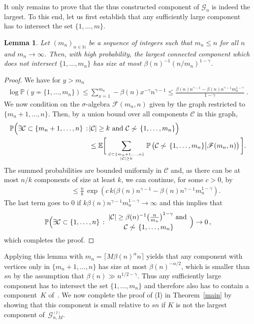 \documentclass[12pt,a4paper]{article}
\numberwithin{equation}{section}
\newtheorem{lemma}[shared]{Lemma}
\begin{document}
 It only remains to  prove that the thus constructed component of $\mathscr G_n$
 is indeed the largest. To this end, let us first establish that any sufficiently large component has to intersect the set $\{1,\dots,m\}$.
\begin{lemma}\label{giant}
    Let $(m_n)_{n\in\mathbb N}$ be a sequence of integers such that $m_n\le n$ for all $n$ and $m_n\to\infty$. Then, with high probability,  the largest connected component which does not intersect $\{1,\ldots,m_n\}$ has size at most $\beta(n)^{-1}(n/m_n)^{1-\gamma}$.
\end{lemma}

\begin{proof}
We have for $y>m_n$
\begin{align*}
    \log\mathbb{P}(y \not\sim\{1,\dots,m_n\})\le \sum_{x=1}^{m_n} -\beta(n)x^{-\gamma} n^{\gamma-1} \le \frac{\beta(n)n^{\gamma-1} -\beta(n)n^{\gamma-1}m_n^{1-\gamma}}{1-\gamma} \;.
\end{align*}
We now condition on the $\sigma$-algebra $\mathscr F(m_n,n)$ given by the graph restricted to
$\{m_n+1,\ldots,n\}$. Then, by a union bound over all components $\mathcal{C}$ in this graph,
\begin{align*}
\mathbb{P}\Big( \exists \mathcal{C}\subset\{m_n+1,\dots,n\}\,:\, &{|\mathcal{C}|\ge k\text{ and } \mathcal{C}\not\sim \,\{1,\dots,m_n\}}\Big) \\
& \le \mathbb E\bigg[ \sum_{\mathcal{C}\subset\{m_n+1,\dots,n\}\atop |\mathcal{C}|\ge k}  \mathbb{P}\left( \mathcal{C}\not\sim \,\{1,\dots,m_n\}\big|
\mathscr F(m_n,n)\right)\bigg].
\end{align*}
The summed probabilities are bounded uniformly in $\mathcal C$ and,
as there can be at most $n/k$ components of size at least $k$, we can continue, for some $c>0$, by
\begin{align*}
\phantom{\mathbb{P}\Big( \exists \mathcal{C}\subset} &
& \le \frac{n}{k}\,\exp\left(c\,k(\beta(n)n^{\gamma-1} -\beta(n)n^{\gamma-1}m_n^{1-\gamma}\right).
\end{align*}
The last term goes to 0 if $k\beta(n)n^{\gamma-1}m_n^{1-\gamma}\to \infty$ and this implies that 
$$ \mathbb{P}\Big( \exists \mathcal{C}\subset\{1,\dots,n\}\,:\, {|\mathcal{C}|\ge \beta(n)^{-1}\big( \frac{n}{m_n} \big)^{1-\gamma}\text{ and }\atop \mathcal{C}\not\sim \,\{1,\dots,m_n\}}\Big) \to 0 \,,$$
which completes the proof.
\end{proof}

Applying this lemma with $m_n=\lceil M\beta(n)^{\alpha}n\rceil $ yields that any component with vertices only in $\{m_n+1,\dots,n\}$ has size at most $\beta(n)^{-\alpha/2}$, which is smaller than $sn$ by the assumption that $\beta(n)\gg n^{1/2-\gamma}$. Thus any sufficiently large component has to intersect the set $\{1,\dots,m_n\}$ and therefore also has to contain a component~$K$ of~. 
We now complete the proof of (I) in Theorem~\ref{main} by showing that this component is small relative to $sn$ if
$K$ is not the largest component of~$\mathcal G^{_{(2)}}_{n,M}$.
\smallskip
\end{document}
